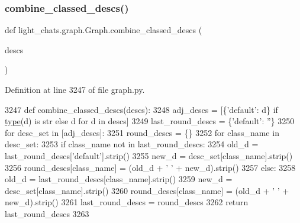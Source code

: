 \subsubsection{\texorpdfstring{combine\+\_\+classed\+\_\+descs()}{combine\_classed\_descs()}}
{\footnotesize\ttfamily def light\+\_\+chats.\+graph.\+Graph.\+combine\+\_\+classed\+\_\+descs (\begin{DoxyParamCaption}\item[{}]{descs }\end{DoxyParamCaption})}



Definition at line 3247 of file graph.\+py.


\begin{DoxyCode}
3247     \textcolor{keyword}{def }combine\_classed\_descs(descs):
3248         adj\_descs = [\{\textcolor{stringliteral}{'default'}: d\} \textcolor{keywordflow}{if} \hyperlink{namespaceparlai_1_1agents_1_1tfidf__retriever_1_1build__tfidf_ad5dfae268e23f506da084a9efb72f619}{type}(d) \textcolor{keywordflow}{is} str \textcolor{keywordflow}{else} d \textcolor{keywordflow}{for} d \textcolor{keywordflow}{in} descs]
3249         last\_round\_descs = \{\textcolor{stringliteral}{'default'}: \textcolor{stringliteral}{''}\}
3250         \textcolor{keywordflow}{for} desc\_set \textcolor{keywordflow}{in} [adj\_descs]:
3251             round\_descs = \{\}
3252             \textcolor{keywordflow}{for} class\_name \textcolor{keywordflow}{in} desc\_set:
3253                 \textcolor{keywordflow}{if} class\_name \textcolor{keywordflow}{not} \textcolor{keywordflow}{in} last\_round\_descs:
3254                     old\_d = last\_round\_descs[\textcolor{stringliteral}{'default'}].strip()
3255                     new\_d = desc\_set[class\_name].strip()
3256                     round\_descs[class\_name] = (old\_d + \textcolor{stringliteral}{' '} + new\_d).strip()
3257                 \textcolor{keywordflow}{else}:
3258                     old\_d = last\_round\_descs[class\_name].strip()
3259                     new\_d = desc\_set[class\_name].strip()
3260                     round\_descs[class\_name] = (old\_d + \textcolor{stringliteral}{' '} + new\_d).strip()
3261             last\_round\_descs = round\_descs
3262         \textcolor{keywordflow}{return} last\_round\_descs
3263 
\end{DoxyCode}
\mbox{\label{classlight__chats_1_1graph_1_1Graph_a4897dcda9b389f41be824fdffce5055b}} 

